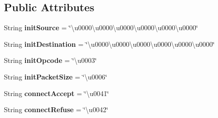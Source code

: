 \subsection*{Public Attributes}
\begin{DoxyCompactItemize}
\item 
\hypertarget{interfacecom_1_1client_1_1mobii_1_1protocol_1_1_i_protocol_a2f3d6ae1bbc5ced972a3dc0ab6dddd09}{String {\bfseries init\-Source} = \char`\"{}\textbackslash{}u0000\textbackslash{}u0000\textbackslash{}u0000\textbackslash{}u0000\textbackslash{}u0000\textbackslash{}u0000\char`\"{}}\label{interfacecom_1_1client_1_1mobii_1_1protocol_1_1_i_protocol_a2f3d6ae1bbc5ced972a3dc0ab6dddd09}

\item 
\hypertarget{interfacecom_1_1client_1_1mobii_1_1protocol_1_1_i_protocol_a836623fa22d83e17ca3be3d99399a60e}{String {\bfseries init\-Destination} = \char`\"{}\textbackslash{}u0000\textbackslash{}u0000\textbackslash{}u0000\textbackslash{}u0000\textbackslash{}u0000\textbackslash{}u0000\char`\"{}}\label{interfacecom_1_1client_1_1mobii_1_1protocol_1_1_i_protocol_a836623fa22d83e17ca3be3d99399a60e}

\item 
\hypertarget{interfacecom_1_1client_1_1mobii_1_1protocol_1_1_i_protocol_adfc9bcbdc04b65f971bd3725b1518ec9}{String {\bfseries init\-Opcode} = \char`\"{}\textbackslash{}u0003\char`\"{}}\label{interfacecom_1_1client_1_1mobii_1_1protocol_1_1_i_protocol_adfc9bcbdc04b65f971bd3725b1518ec9}

\item 
\hypertarget{interfacecom_1_1client_1_1mobii_1_1protocol_1_1_i_protocol_aaf6aacd0f7388eb19dbc43a1cd8f4a24}{String {\bfseries init\-Packet\-Size} = \char`\"{}\textbackslash{}u0006\char`\"{}}\label{interfacecom_1_1client_1_1mobii_1_1protocol_1_1_i_protocol_aaf6aacd0f7388eb19dbc43a1cd8f4a24}

\item 
\hypertarget{interfacecom_1_1client_1_1mobii_1_1protocol_1_1_i_protocol_a1b6b9afd84ac8251708af5b818ccc4aa}{String {\bfseries connect\-Accept} = \char`\"{}\textbackslash{}u0041\char`\"{}}\label{interfacecom_1_1client_1_1mobii_1_1protocol_1_1_i_protocol_a1b6b9afd84ac8251708af5b818ccc4aa}

\item 
\hypertarget{interfacecom_1_1client_1_1mobii_1_1protocol_1_1_i_protocol_af8b4d45dbf839c7bb0f62b462533e83e}{String {\bfseries connect\-Refuse} = \char`\"{}\textbackslash{}u0042\char`\"{}}\label{interfacecom_1_1client_1_1mobii_1_1protocol_1_1_i_protocol_af8b4d45dbf839c7bb0f62b462533e83e}


\end{DoxyCompactItemize}
